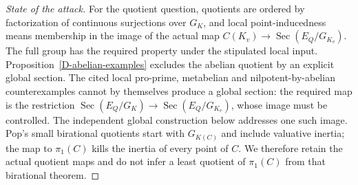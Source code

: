 \begin{proof}[State of the attack]
For the quotient question, quotients are
ordered by factorization of continuous
surjections over $G_K$, and local
point-inducedness means membership in
the image of the actual map
$C(K_v)\to\operatorname{Sec}(E_Q/G_{K_v})$.
The full group has the required property
under the stipulated local input.
Proposition~\ref{D-abelian-examples}
excludes the abelian quotient by an
explicit global section. The cited
local pro-prime, metabelian and
nilpotent-by-abelian counterexamples
cannot by themselves produce a global
section: the required map is the
restriction
$\operatorname{Sec}(E_Q/G_K)\to
\operatorname{Sec}(E_Q/G_{K_v})$,
whose image must be controlled.
The independent global construction
below addresses one such image.
Pop's small birational quotients start
with $G_{K(C)}$ and include valuative
inertia; the map to $\pi_1(C)$ kills
the inertia of every point of $C$.
We therefore retain the actual quotient
maps and do not infer a least quotient
of $\pi_1(C)$ from that birational theorem.
\end{proof}


